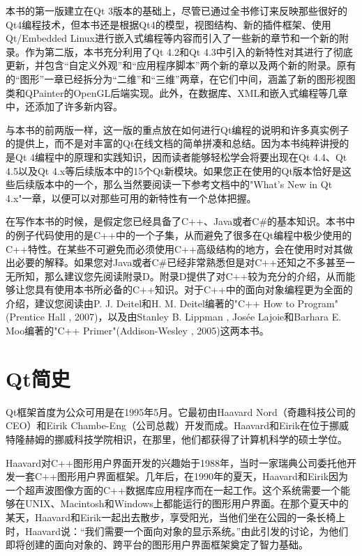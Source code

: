 \documentclass[11pt,oneside]{book}
\begin{document}
\begin{common-format}
本书的第一版建立在Qt 3版本的基础上，尽管已通过全书修订来反映那些很好的Qt4编程技术，但本书还是根据Qt4的模型，视图结构、新的插件框架、使用Qt/Embedded Linux进行嵌入式编程等内容而引入了一些新的章节和一个新的附录。作为第二版，本书充分利用了Qt 4.2和Qt 4.3中引入的新特性对其进行了彻底更新，并包含“自定义外观”和“应用程序脚本”两个新的章以及两个新的附录。原有的“图形”一章已经拆分为“二维”和“三维”两章，在它们中间，涵盖了新的图形视图类和QPainter的OpenGL后端实现。此外，在数据库、XML和嵌入式编程等几章中，还添加了许多新内容。

与本书的前两版一样，这一版的重点放在如何进行Qt编程的说明和许多真实例子的提供上，而不是对丰富的Qt在线文档的简单拼凑和总结。因为本书纯粹讲授的是Qt 4编程中的原理和实践知识，因而读者能够轻松学会将要出现在Qt 4.4、Qt 4.5以及Qt 4.x等后续版本中的15个Qt新模块。如果您正在使用的Qt版本恰好是这些后续版本中的一个，那么当然要阅读一下参考文档中的"What's New in Qt 4.x"一章，以便可以对那些可用的新特性有一个总体把握。

在写作本书的时候，是假定您已经具备了C++、Java或者C\#{}的基本知识。本书中的例子代码使用的是C++中的一个子集，从而避免了很多在Qt编程中极少使用的C++特性。在某些不可避免而必须使用C++高级结构的地方，会在使用时对其做出必要的解释。如果您对Java或者C\#{}已经非常熟悉但是对C++还知之不多甚至一无所知，那么建议您先阅读附录D。附录D提供了对C++较为充分的介绍，从而能够让您具有使用本书所必备的C++知识。对于C++中的面向对象编程更为全面的介绍，建议您阅读由P. J. Deitel和H. M. Deitel编著的"C++ How to Program"(Prentice Hall , 2007)，以及由Stanley B. Lippman , Josée Lajoie和Barhara E. Moo编著的"C++ Primer"(Addison-Wesley , 2005)这两本书。

\section*{Qt简史}
Qt框架首度为公众可用是在1995年5月。它最初由Haavard Nord（奇趣科技公司的CEO）和Eirik Chambe-Eng（公司总裁）开发而成。Haavard和Eirik在位于挪威特隆赫姆的挪威科技学院相识，在那里，他们都获得了计算机科学的硕士学位。

Haavard对C++图形用户界面开发的兴趣始于1988年，当时一家瑞典公司委托他开发一套C++图形用户界面框架。几年后，在1990年的夏天，Haavard和Eirik因为一个超声波图像方面的C++数据库应用程序而在一起工作。这个系统需要一个能够在UNIX、Macintosh和Windows上都能运行的图形用户界面。在那个夏天中的某天，Haavard和Eirik一起出去散步，享受阳光，当他们坐在公园的一条长椅上时，Haavard说：“我们需要一个面向对象的显示系统。”由此引发的讨论，为他们即将创建的面向对象的、跨平台的图形用户界面框架奠定了智力基础。


\end{common-format}
\end{document}

